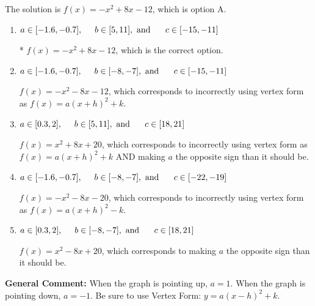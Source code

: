 \documentclass{extbook}[14pt]
\begin{document}
\begin{enumerate}
{The solution is \( f(x) = -x^{2} +8 x -12 \), which is option A.\begin{enumerate}[label=\Alph*.]
\item \( a \in [-1.6, -0.7], \hspace*{5mm} b \in [5, 11], \text{ and } \hspace*{5mm} c \in [-15, -11] \)

* $f(x)=-x^{2} +8 x -12$, which is the correct option.
\item \( a \in [-1.6, -0.7], \hspace*{5mm} b \in [-8, -7], \text{ and } \hspace*{5mm} c \in [-15, -11] \)

$f(x)=-x^{2} -8 x -12$, which corresponds to incorrectly using vertex form as $f(x) = a(x+h)^2+k$.
\item \( a \in [0.3, 2], \hspace*{5mm} b \in [5, 11], \text{ and } \hspace*{5mm} c \in [18, 21] \)

$f(x)=x^{2} +8 x + 20$, which corresponds to incorrectly using vertex form as $f(x) = a(x+h)^2+k$ AND making $a$ the opposite sign than it should be.
\item \( a \in [-1.6, -0.7], \hspace*{5mm} b \in [-8, -7], \text{ and } \hspace*{5mm} c \in [-22, -19] \)

$f(x)=-x^{2} -8 x -20$, which corresponds to incorrectly using vertex form as $f(x) = a(x+h)^2 - k$.
\item \( a \in [0.3, 2], \hspace*{5mm} b \in [-8, -7], \text{ and } \hspace*{5mm} c \in [18, 21] \)

$f(x)=x^{2} -8 x + 20$, which corresponds to making $a$ the opposite sign than it should be.
\end{enumerate}

\textbf{General Comment:} When the graph is pointing up, $a=1$. When the graph is pointing down, $a=-1$. Be sure to use Vertex Form: $y = a(x-h)^2+k$.
}
\end{enumerate}
\end{document}
